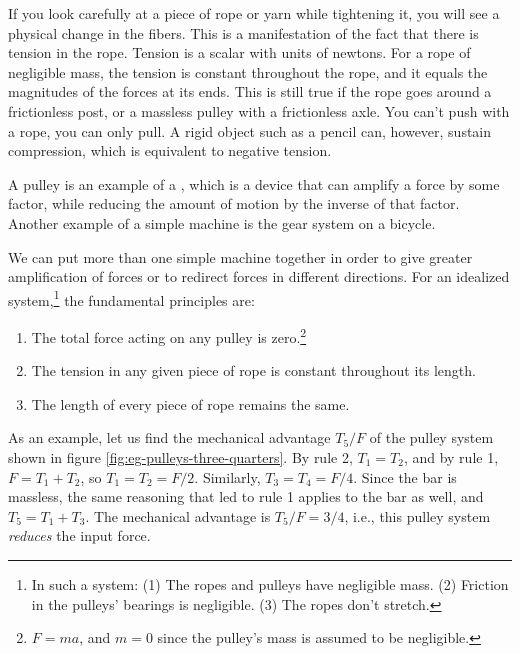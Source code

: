 If you look carefully at a piece of rope or yarn while tightening it,
you will see a physical change in the fibers. This is a manifestation
of the fact that there is tension in the rope. Tension is a scalar with
units of newtons. For a rope of negligible mass, the tension is constant
throughout the rope, and it equals the magnitudes of the forces at its
ends. This is still true if the rope goes around a frictionless post,
or a massless pulley with a frictionless axle. You can't push with a
rope, you can only pull. A rigid object such as a pencil can, however,
sustain compression, which is equivalent to negative tension.

A pulley is an example of a ,
which is a device that can
amplify a force by some factor, while reducing the amount of motion
by the inverse of that factor. Another example of a simple machine is
the gear system on a bicycle.

We can put more than one simple machine together in order
to give greater
amplification of forces or to redirect forces in different directions.
For an idealized system,\footnote{In such a system: (1) The ropes and pulleys have negligible mass. (2)
Friction in the pulleys' bearings is negligible. (3) The ropes don't stretch.} the fundamental principles are:

\begin{enumerate}\label{pulley-rules}
\item The total force acting on any pulley is zero.\footnote{$F=ma$, and $m=0$ since the pulley's mass is assumed to be negligible.}
\item The tension in any given piece of rope is
      constant throughout its length.
\item The length of every piece of rope remains the same.
\end{enumerate}


As an example, let us find the mechanical advantage $T_5/F$ of the pulley system shown in
figure \ref{fig:eg-pulleys-three-quarters}. 
By rule 2, $T_1=T_2$, and by rule 1, $F=T_1+T_2$, so $T_1=T_2=F/2$. Similarly, $T_3=T_4=F/4$.
Since the bar is massless, the same reasoning that led to rule 1 applies to the bar as well, and $T_5=T_1+T_3$.
The mechanical advantage is $T_5/F=3/4$, i.e., this pulley system \emph{reduces} the input force.
